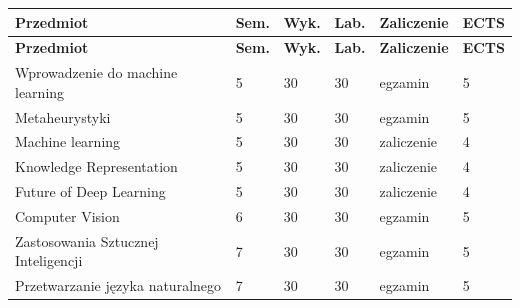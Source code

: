 \documentclass[12pt,a4paper]{article}
\newcommand{\thdrule}{\noalign{\global\setlength{\extrarowheight}{0pt}}}
\newcommand{\thdend}{\noalign{\global\setlength{\extrarowheight}{4pt}}}
\begin{document}
{\scriptsize
\begin{longtable}{m{6.5cm}m{0.7cm}m{1cm}m{1cm}m{1.7cm}m{0.7cm}}
\thdrule\toprule
\rowcolor{pjatkRed}
{\color{white}\footnotesize\textbf{\vphantom{Ag}Przedmiot}} & {\color{white}\footnotesize\textbf{\vphantom{Ag}Sem.}} & {\color{white}\footnotesize\textbf{\vphantom{Ag}Wyk.}} & {\color{white}\footnotesize\textbf{\vphantom{Ag}Lab.}} & {\color{white}\footnotesize\textbf{\vphantom{Ag}Zaliczenie}} & {\color{white}\footnotesize\textbf{\vphantom{Ag}ECTS}} \\
\midrule\thdend
\endfirsthead
\thdrule\toprule
\rowcolor{pjatkRed}
{\color{white}\footnotesize\textbf{\vphantom{Ag}Przedmiot}} & {\color{white}\footnotesize\textbf{\vphantom{Ag}Sem.}} & {\color{white}\footnotesize\textbf{\vphantom{Ag}Wyk.}} & {\color{white}\footnotesize\textbf{\vphantom{Ag}Lab.}} & {\color{white}\footnotesize\textbf{\vphantom{Ag}Zaliczenie}} & {\color{white}\footnotesize\textbf{\vphantom{Ag}ECTS}} \\
\midrule\thdend
\endhead
\rowcolor{tableRowLight} Wprowadzenie do machine learning & 5 & 30 & 30 & {\scriptsize egzamin} & 5 \\
\rowcolor{tableRowAlt} Metaheurystyki & 5 & 30 & 30 & {\scriptsize egzamin} & 5 \\
\rowcolor{tableRowLight} Machine learning & 5 & 30 & 30 & {\scriptsize zaliczenie} & 4 \\
\rowcolor{tableRowAlt} Knowledge Representation & 5 & 30 & 30 & {\scriptsize zaliczenie} & 4 \\
\rowcolor{tableRowLight} Future of Deep Learning & 5 & 30 & 30 & {\scriptsize zaliczenie} & 4 \\
\rowcolor{tableRowAlt} Computer Vision & 6 & 30 & 30 & {\scriptsize egzamin} & 5 \\
\rowcolor{tableRowLight} Zastosowania Sztucznej Inteligencji & 7 & 30 & 30 & {\scriptsize egzamin} & 5 \\
\rowcolor{tableRowAlt} Przetwarzanie języka naturalnego & 7 & 30 & 30 & {\scriptsize egzamin} & 5 \\
\bottomrule
\end{longtable}}
\end{document}
